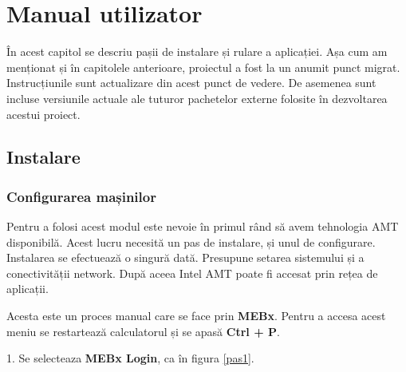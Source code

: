 
\chapter{Manual utilizator}

\label{cap:user-manual}


%
%


În acest capitol se descriu pașii de instalare și rulare a aplicației. Așa cum am menționat și în capitolele anterioare, proiectul a fost la un anumit punct migrat. Instrucțiunile sunt actualizare din acest punct de vedere. De asemenea sunt incluse versiunile actuale ale tuturor pachetelor externe folosite în dezvoltarea acestui proiect.

\section{Instalare}

\subsection{Configurarea mașinilor}

Pentru a folosi acest modul este nevoie în primul rând să avem tehnologia AMT disponibilă. Acest lucru necesită un pas de instalare, și unul de configurare. Instalarea se efectuează o singură dată. Presupune setarea sistemului și a conectivității network. După aceea Intel AMT poate fi accesat prin rețea de aplicații.

Acesta este un proces manual care se face prin \textbf{MEBx}. Pentru a accesa acest meniu se restartează calculatorul și se apasă \textbf{Ctrl + P}.

1. Se selecteaza \textbf{MEBx Login}, ca în figura \ref{pas1}.  
 
